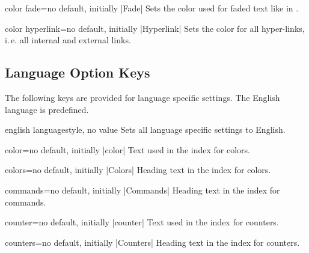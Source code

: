 \begin{docTcbKey}{color fade}{=}{no default, initially |Fade|}
  Sets the color used for faded text like 
  in .
\end{docTcbKey}


\begin{docTcbKey}{color hyperlink}{=}{no default, initially |Hyperlink|}
  Sets the color for all hyper-links, i.\,e. all internal and external links.
\end{docTcbKey}


\clearpage
\subsection{Language Option Keys}

The following keys are provided for language specific settings.
The English language is predefined.

\begin{docTcbKey}{english language}{}{style, no value}
  Sets all language specific settings to English.
\end{docTcbKey}

\begin{langTcbKey}{color}{=}{no default, initially |color|}
  Text used in the index for colors.
\end{langTcbKey}

\begin{langTcbKey}{colors}{=}{no default, initially |Colors|}
  Heading text in the index for colors.
\end{langTcbKey}

\begin{langTcbKey}[][doc new={2022-06-20}]{commands}{=}{no default, initially |Commands|}
  Heading text in the index for commands.
\end{langTcbKey}

\begin{langTcbKey}[][doc new={2015-01-08}]{counter}{=}{no default, initially |counter|}
  Text used in the index for counters.
\end{langTcbKey}

\begin{langTcbKey}[][doc new={2015-01-08}]{counters}{=}{no default, initially |Counters|}
  Heading text in the index for counters.
\end{langTcbKey}

